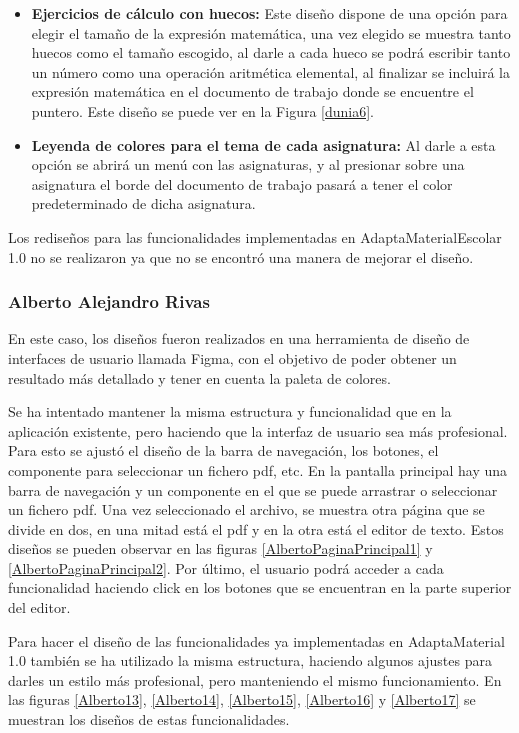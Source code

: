 \begin{itemize}
  \item  \textbf{Ejercicios de cálculo con huecos:} Este diseño dispone de una opción para elegir el tamaño de la expresión matemática, una vez elegido se muestra tanto huecos como el tamaño escogido, al darle a cada hueco se podrá escribir tanto un número como una operación aritmética elemental, al finalizar se incluirá la expresión matemática en el documento de trabajo donde se encuentre el puntero. Este diseño se puede ver en la Figura \ref{dunia6}.
  \item  \textbf{Leyenda de colores para el tema de cada asignatura:} Al darle a esta opción se abrirá un menú con las asignaturas, y al presionar sobre una asignatura el borde del documento de trabajo pasará a tener el color predeterminado de dicha asignatura.
\end{itemize}
Los rediseños para las funcionalidades implementadas en AdaptaMaterialEscolar 1.0 no se realizaron ya que no se encontró una manera de mejorar el diseño.

\subsubsection{Alberto Alejandro Rivas}
En este caso, los diseños fueron realizados en una herramienta de diseño de interfaces de usuario llamada Figma, con el objetivo de poder obtener un resultado más detallado y tener en cuenta la paleta de colores.

Se ha intentado mantener la misma estructura y funcionalidad que en la aplicación existente, pero haciendo que la interfaz de usuario sea más profesional. Para esto se ajustó el diseño de la barra de navegación, los botones, el componente para seleccionar un fichero pdf, etc. En la pantalla principal hay una barra de navegación y un componente en el que se puede arrastrar o seleccionar un fichero pdf. Una vez seleccionado el archivo, se muestra otra página que se divide en dos, en una mitad está el pdf y en la otra está el editor de texto. Estos diseños se pueden observar en las figuras \ref{AlbertoPaginaPrincipal1} y \ref{AlbertoPaginaPrincipal2}. Por último, el usuario podrá acceder a cada funcionalidad haciendo click en los botones que se encuentran en la parte superior del editor.

Para hacer el diseño de las funcionalidades ya implementadas en AdaptaMaterial 1.0 también se ha utilizado la misma estructura, haciendo algunos ajustes para darles un estilo más profesional, pero manteniendo el mismo funcionamiento. En las figuras \ref{Alberto13}, \ref{Alberto14}, \ref{Alberto15}, \ref{Alberto16} y \ref{Alberto17} se muestran los diseños de estas funcionalidades.

